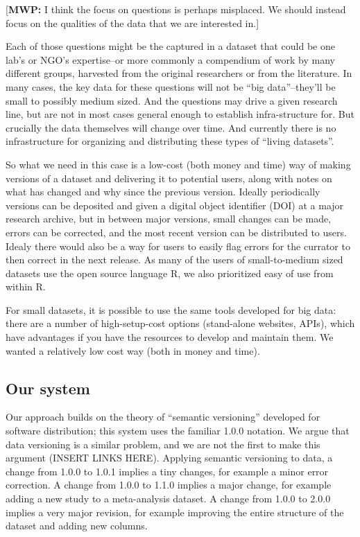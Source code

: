 \documentclass[a4paper,11pt]{article}
\begin{document}
{[}\textbf{MWP:} I think the focus on questions is perhaps misplaced. We
should instead focus on the qualities of the data that we are interested
in.{]}

Each of those questions might be the captured in a dataset that could be
one lab's or NGO's expertise--or more commonly a compendium of work by
many different groups, harvested from the original researchers or from
the literature. In many cases, the key data for these questions will not
be ``big data''--they'll be small to possibly medium sized. And the
questions may drive a given research line, but are not in most cases
general enough to establish infra-structure for. But crucially the data
themselves will change over time. And currently there is no
infrastructure for organizing and distributing these types of ``living
datasets''.

So what we need in this case is a low-cost (both money and time) way of
making versions of a dataset and delivering it to potential users, along
with notes on what has changed and why since the previous version.
Ideally periodically versions can be deposited and given a digital
object identifier (DOI) at a major research archive, but in between
major versions, small changes can be made, errors can be corrected, and
the most recent version can be distributed to users. Idealy there would
also be a way for users to easily flag errors for the currator to then
correct in the next release. As many of the users of small-to-medium
sized datasets use the open source language R, we also prioritized easy
of use from within R.

For small datasets, it is possible to use the same tools developed for
big data: there are a number of high-setup-cost options (stand-alone
websites, APIs), which have advantages if you have the resources to
develop and maintain them. We wanted a relatively low cost way (both in
money and time).

\subsection{Our system}

Our approach builds on the theory of ``semantic versioning'' developed
for software distribution; this system uses the familiar 1.0.0 notation.
We argue that data versioning is a similar problem, and we are not the
first to make this argument (INSERT LINKS HERE). Applying semantic
versioning to data, a change from 1.0.0 to 1.0.1 implies a tiny changes,
for example a minor error correction. A change from 1.0.0 to 1.1.0
implies a major change, for example adding a new study to a meta-analysis
dataset. A change from 1.0.0 to 2.0.0 implies a very major revision, for
example improving the entire structure of the dataset and adding new
columns.
\end{document}
